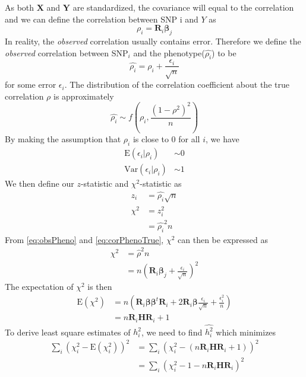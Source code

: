 			As both $\boldsymbol{X}$ and $\boldsymbol{Y}$ are standardized, the covariance will equal to the correlation and we can define the correlation between \gls{SNP} i and $Y$ as
			\begin{equation}
				\rho_i = \boldsymbol{R}_i\boldsymbol{\beta}_j
				\label{eq:corPhenoTrue}
			\end{equation}
			In reality, the \emph{observed} correlation usually contains error. 
			Therefore we define the \emph{observed} correlation between SNP$_i$ and the phenotype($\hat{\rho_i}$) to be
			\begin{equation}
			\hat{\rho_i} = \rho_i+\frac{\epsilon_i}{\sqrt{n}}
			\label{eq:obsPheno}
			\end{equation}
			for some error $\epsilon_i$. 
			The distribution of the correlation coefficient about the true correlation $\rho$ is approximately
			$$
				\hat{\rho_i}\sim f(\rho_i, \frac{(1-\rho^2)^2}{n})
			$$
			By making the assumption that $\rho_i$ is close to 0 for all $i$, we have 
			\begin{align*}
				\mathrm{E}(\epsilon_i|\rho_i)&\sim 0\\
				\mathrm{Var}(\epsilon_i|\rho_i)&\sim 1
			\end{align*}
			We then define our $z$-statistic and $\chi^2$-statistic as
			\begin{align*}
				z_i &= \hat{\rho_i}\sqrt{n} \\
				\chi^2 &= z_i^2\\
				&=\hat{\rho_i}^2n
			\end{align*}
			From \cref{eq:obsPheno} and \cref{eq:corPhenoTrue}, $\chi^2$ can then be expressed as
			\begin{align*}
			\chi^2&=\hat{\rho}^2n\\
			&=n(\boldsymbol{R}_i\boldsymbol{\beta}_j+\frac{\epsilon_i}{\sqrt{n}})^2
			\end{align*}
			The expectation of $\chi^2$ is then
			\begin{align*}
			\mathrm{E}(\chi^2) &= n(\boldsymbol{R}_i\boldsymbol{\beta\beta}^t\boldsymbol{R}_i+2\boldsymbol{R}_i\boldsymbol{\beta}\frac{\epsilon_i}{\sqrt{n}}+\frac{\epsilon_i^2}{n}) \\
			&= n\boldsymbol{R}_i\boldsymbol{H}\boldsymbol{R}_i+1
			\end{align*}
			To derive least square estimates of $h_i^2$, we need to find $\hat{h_i^2}$ which minimizes
			\begin{align*}
				\sum_i(\chi_i^2-\mathrm{E}(\chi_i^2))^2&=\sum_i(\chi_i^2-(n\boldsymbol{R}_i\boldsymbol{H}\boldsymbol{R}_i+1))^2 \\
				&=\sum_i(\chi_i^2-1-n\boldsymbol{R}_i\boldsymbol{H}\boldsymbol{R}_i)^2 
			\end{align*}
